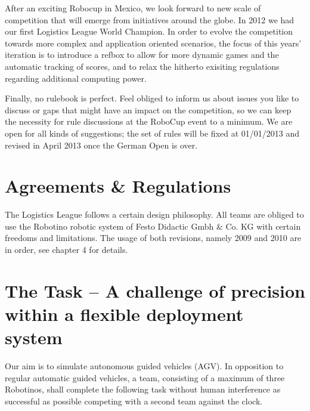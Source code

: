 \documentclass[12pt,twoside]{article}
\begin{document}
After an exciting Robocup in Mexico, we look forward to new scale of
competition that will emerge from initiatives around the globe. In
2012 we had our first Logistics League World Champion. In order
to evolve the competition towards more complex and application oriented
scenarios, the focus of this years' iteration is to introduce a refbox
to allow for more dynamic games and the automatic tracking of scores,
and to relax the hitherto exisiting regulations regarding additional
computing power.

Finally, no rulebook is perfect. Feel obliged to inform us about
issues you like to discuss or gaps that might have an impact on the
competition, so we can keep the necessity for rule discussions at the
RoboCup event to a minimum. We are open for all kinds of suggestions;
the set of rules will be fixed at 01/01/2013 and revised in April 2013
once the German Open is over.


\section{Agreements \& Regulations}

The Logistics League follows a certain design philosophy. All teams
are obliged to use the Robotino robotic system of Festo Didactic Gmbh
\& Co. KG with certain freedoms and limitations. The usage of both
revisions, namely 2009 and 2010 are in order, see chapter 4 for
details.


\section{The Task -- A challenge of precision within a flexible
  deployment system}

Our aim is to simulate autonomous guided vehicles (AGV). In opposition
to regular automatic guided vehicles, a team, consisting of a maximum
of three Robotinos, shall complete the following task without human
interference as successful as possible competing with a second team
against the clock.
\end{document}
